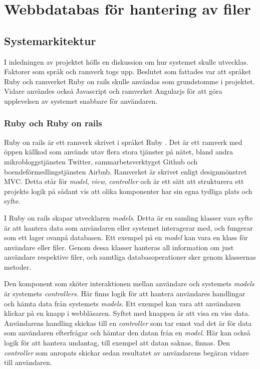 \chapter{Webbdatabas för hantering av filer}

\section{Systemarkitektur}
I inledningen av projektet hölls en diskussion om hur systemet skulle utvecklas. Faktorer som språk och ramverk togs upp. Beslutet som fattades var att språket Ruby och ramverket Ruby on rails skulle användas som grundstomme i projektet. Vidare användes också Javascript och ramverket Angularjs för att göra upplevelsen av systemet snabbare för användaren.

\subsection{Ruby och Ruby on rails}
Ruby on rails är ett ramverk skrivet i språket Ruby \cite{rubylang}. Det är ett ramverk med öppen källkod som används utav flera stora tjänster på nätet, bland andra mikrobloggstjänsten Twitter, sammarbetsverktyget Github och boendeförmedlingstjänsten Airbnb. Ramverket är skrivet enligt designmönstret MVC. Detta står för \textit{model}, \textit{view}, \textit{controller} och är ett sätt att strukturera ett projekts logik på sådant vis att olika komponenter har sin egna tydliga plats och syfte.

I Ruby on rails skapar utvecklaren \textit{models}. Detta är en samling klasser vars syfte är att hantera data som användaren eller systemet interagerar med, och fungerar som ett lager ovanpå databasen. Ett exempel på en \textit{model} kan vara en klass för användare eller filer. Genom dessa klasser hanteras all information om just användare respektive filer, och samtliga databasoperationer sker genom klassernas metoder.

Den komponent som sköter interaktionen mellan användare och systemets \textit{models} är systemets \textit{controllers}. Här finns logik för att hantera användares handlingar och hämta data från systemets \textit{models}. Ett exempel kan vara att användaren klickar på en knapp i webbläsaren. Syftet med knappen är att visa en viss data. Användarens handling skickas till en \textit{controller} som tar emot vad det är för data som användaren efterfrågar och hämtar den datan från en \textit{model}. Här kan också logik för att hantera undantag, till exempel att datan saknas, finnas. Den \textit{controller} som anropats skickar sedan resultatet av användarens begäran vidare till användaren.

